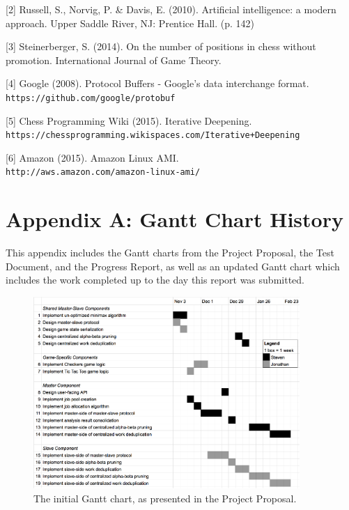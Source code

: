 \documentclass[pdftex,12pt,a4paper]{article}
\begin{document}
[2] Russell, S., Norvig, P. \& Davis, E. (2010). Artificial intelligence: a modern approach. Upper Saddle River, NJ: Prentice Hall. (p. 142)

[3] Steinerberger, S. (2014). On the number of positions in chess without promotion. International Journal of Game Theory.

[4] Google (2008). Protocol Buffers - Google's data interchange format.\\ \texttt{https://github.com/google/protobuf }

[5] Chess Programming Wiki (2015). Iterative Deepening.\\ \texttt{https://chessprogramming.wikispaces.com/Iterative+Deepening}

[6] Amazon (2015). Amazon Linux AMI.\\ \texttt{http://aws.amazon.com/amazon-linux-ami/}


%
%
\pagebreak
\section{Appendix A: Gantt Chart History}

This appendix includes the Gantt charts from the Project Proposal, the Test Document, and the Progress Report, as well as an updated Gantt chart which includes the work completed up to the day this report was submitted.

\begin{figure}[H]
\begin{center}
\includegraphics[width=0.9\textwidth]{img/gantt-proposal}
\caption{The initial Gantt chart, as presented in the Project Proposal.}
\end{center}
\end{figure}
\end{document}
